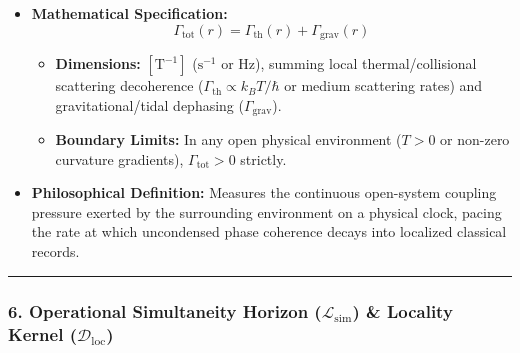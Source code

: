 \documentclass[
]{article}
\providecommand{\tightlist}{%
  \setlength{\itemsep}{0pt}\setlength{\parskip}{0pt}}
\begin{document}
\begin{itemize}
\tightlist
\item
  \textbf{Mathematical Specification:}
  \[\Gamma_{\mathrm{tot}}(r) = \Gamma_{\mathrm{th}}(r) + \Gamma_{\mathrm{grav}}(r)\]

  \begin{itemize}
  \tightlist
  \item
    \textbf{Dimensions:} \([\text{T}^{-1}]\) (\(\mathrm{s}^{-1}\) or
    \(\mathrm{Hz}\)), summing local thermal/collisional scattering
    decoherence (\(\Gamma_{\mathrm{th}} \propto k_B T / \hbar\) or
    medium scattering rates) and gravitational/tidal dephasing
    (\(\Gamma_{\mathrm{grav}}\)).
  \item
    \textbf{Boundary Limits:} In any open physical environment
    (\(T > 0\) or non-zero curvature gradients),
    \(\Gamma_{\mathrm{tot}} > 0\) strictly.
  \end{itemize}
\item
  \textbf{Philosophical Definition:} Measures the continuous open-system
  coupling pressure exerted by the surrounding environment on a physical
  clock, pacing the rate at which uncondensed phase coherence decays
  into localized classical records.
\end{itemize}

\begin{center}\rule{0.5\linewidth}{0.5pt}\end{center}

\subsubsection{\texorpdfstring{6. Operational Simultaneity Horizon
(\(\mathcal{L}_{\mathrm{sim}}\)) \& Locality Kernel
(\(\mathcal{D}_{\mathrm{loc}}\))}{6. Operational Simultaneity Horizon (\textbackslash mathcal\{L\}\_\{\textbackslash mathrm\{sim\}\}) \& Locality Kernel (\textbackslash mathcal\{D\}\_\{\textbackslash mathrm\{loc\}\})}}\label{operational-simultaneity-horizon-mathcall_mathrmsim-locality-kernel-mathcald_mathrmloc}
\end{document}
